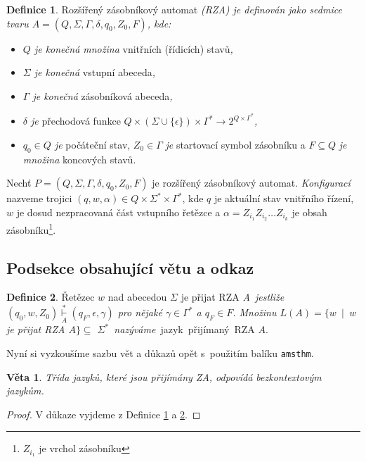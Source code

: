 \documentclass[a4paper, 11pt, twocolumn]{article}
\theoremstyle{definition}
\newtheorem{definition}{Definice}
\theoremstyle{plain}
\newtheorem{theorem}{Věta}
\begin{document}
    \begin{definition}\label{def1}
        Rozšířený zásobníkový automat \textit{(RZA) je definován jako sedmice tvaru
            $A = (Q, \Sigma, \Gamma, \delta, q_{0}, Z_{0},F)$, kde:}
            \begin{itemize}
            \item \textit{$Q$ je konečná množina} vnitřních (řídicích) stavů\emph{,}
            \item \textit{$\Sigma$ je konečná} vstupní abeceda\emph{,}
            \item \textit{$\Gamma$ je konečná} zásobníková abeceda\emph{,}
            \item \textit{$\delta$ je} přechodová funkce $Q\times(\Sigma\cup\{\epsilon\})\times\Gamma^{*}\to2^{Q\times\Gamma^{*}}$\emph{,}
            \item \textit{$q_{0} \in Q$ je} počáteční stav, $Z_{0} \in \Gamma$ \textit{je} startovací symbol zásobníku a $F \subseteq Q$ \textit{je množina} koncových stavů.
        \end{itemize}
    \end{definition}

    Nechť $P = (Q, \Sigma, \Gamma, \delta, q_{0}, Z_{0},F)$ je rozšířený zásobníkový automat.
    \textit{Konfigurací} nazveme trojici $(q,w,\alpha)\in Q\times\Sigma^{*}\times\Gamma^{*}$, kde $q$ je aktuální stav vnitřního řízení,
    $w$ je dosud nezpracovaná část vstupního řetězce a $\alpha = Z_{i_{1}}Z_{i_{2}} \dots Z_{i_{k}}$
    je obsah zásobníku\footnote{$Z_{i_{1}}$ je vrchol zásobníku}.

    \subsection{Podsekce obsahující větu a odkaz}

    \begin{definition}\label{def2}
        Řetězec $w$ nad abecedou $\Sigma$ je přijat RZA \textit{A~jestliže $(q_{0},w,Z_{0})\overset{*}
        {\underset{A}{\vdash}}(q_{F},\epsilon,\gamma)$ pro nějaké $\gamma\in\Gamma^{*}$ a
        $q_{F}\in F$. Množinu $L(A) = \{w$ \,$|$\, $w$ je přijat RZA $A\}\subseteq$ $\Sigma^{*}$~nazýváme}~jazyk~přijímaný~RZA $A$.
    \end{definition}

    Nyní si vyzkoušíme sazbu vět a důkazů opět s~použitím
    balíku \verb;amsthm;.

    \begin{theorem}
        Třída jazyků, které jsou přijímány ZA, odpovídá \textup{bezkontextovým jazykům.}
    \end{theorem}
    \begin{proof}
        \textup{V důkaze vyjdeme z Definice \ref{def1} a \ref{def2}}.
    \end{proof}
\end{document}
